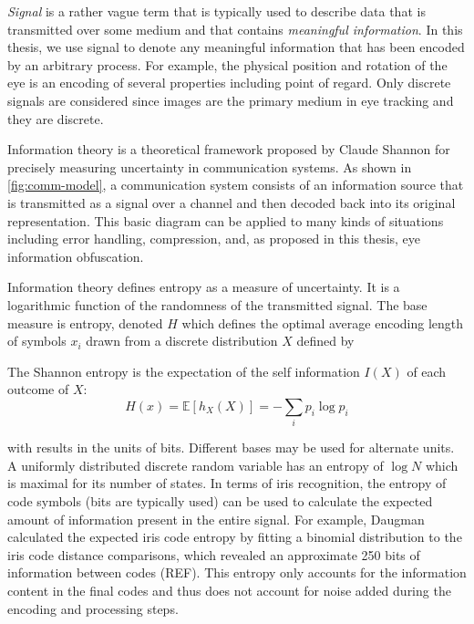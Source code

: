 \textit{Signal} is a rather vague term that is typically used to describe data that is transmitted over some medium and that contains \textit{meaningful information}. In this thesis, we use signal to denote any meaningful information that has been encoded by an arbitrary process. For example, the physical position and rotation of the eye is an encoding of several properties including point of regard. Only discrete signals are considered since images are the primary medium in eye tracking and they are discrete.

Information theory is a theoretical framework proposed by Claude Shannon for precisely measuring uncertainty in communication systems. As shown in \cref{fig:comm-model}, a communication system consists of an information source that is transmitted as a signal over a channel and then decoded back into its original representation. This basic diagram can be applied to many kinds of situations including error handling, compression, and, as proposed in this thesis, eye information obfuscation.


Information theory defines entropy as a measure of uncertainty. It is a logarithmic function of the randomness of the transmitted signal. 
The base measure is entropy, denoted $H$ which defines the optimal average encoding length of symbols $x_i$ drawn from a discrete distribution $X$ defined by
\begin{definition}
The Shannon entropy is the expectation of the self information $I(X)$ of each outcome of $X$:
\begin{equation}
    H(x) = \mathbb{E}[h_X(X)] = - \sum_i p_i\log p_i
\end{equation}
\end{definition}

with results in the units of bits. Different bases may be used for alternate units. A uniformly distributed discrete random variable has an entropy of $\log{N}$ which is maximal for its number of states. In terms of iris recognition, the entropy of code symbols (bits are typically used) can be used to calculate the expected amount of information present in the entire signal. For example, Daugman calculated the expected iris code entropy by fitting a binomial distribution to the iris code distance comparisons, which revealed an approximate 250 bits of information between codes (REF). This entropy only accounts for the information content in the final codes and thus does not account for noise added during the encoding and processing steps. 

